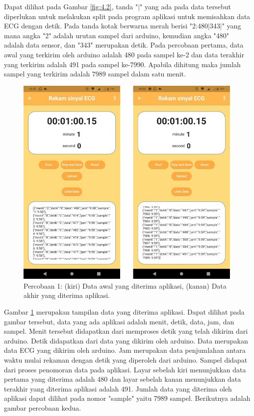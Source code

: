 \vspace{1ex}
Dapat dilihat pada Gambar \ref{fig:4.2}, tanda "$\mid$" yang ada pada data tersebut diperlukan untuk melakukan split pada program aplikasi untuk memisahkan data ECG dengan detik. Pada tanda kotak berwarna merah berisi "2:480$\mid$343$\mid$" yang mana angka "2" adalah urutan sampel dari arduino, kemudian angka "480" adalah data sensor, dan "343" merupakan detik. Pada percobaan pertama, data awal yang terkirim oleh arduino adalah 480 pada sampel ke-2 dan data terakhir yang terkirim adalah 491 pada sampel ke-7990. Apabila dihitung maka jumlah sampel yang terkirim adalah 7989 sampel dalam satu menit.
\begin{figure}[H] \centering
	\includegraphics[width=1\textwidth]{img/percob/Slide11}	             
	\caption{Percobaan 1: (kiri) Data awal yang diterima aplikasi, (kanan) Data akhir yang diterima aplikasi.}
	\label{fig:4.2.0}
\end{figure}
\vspace{1ex}
Gambar \ref{fig:4.2.0} merupakan tampilan data yang diterima aplikasi. Dapat dilihat pada gambar tersebut, data yang ada aplikasi adalah menit, detik, data, jam, dan sampel. Menit tersebut didapatkan dari memproses detik yang telah dikirim dari arduino. Detik didapatkan dari data yang dikirim oleh arduino. Data merupakan data ECG yang dikirim oleh arduino. Jam merupakan data penjumlahan antara waktu mulai rekaman dengan detik yang diperoleh dari arduino. Sampel didapat dari proses penomoran data pada aplikasi.  Layar sebelah kiri menunjukkan data pertama yang diterima adalah 480 dan layar sebelah kanan menunjukkan data terakhir yang diterima aplikasi adalah 491. Jumlah data yang diterima oleh aplikasi dapat dilihat pada nomor "sample" yaitu 7989 sampel. Berikutnya adalah gambar percobaan kedua. 
